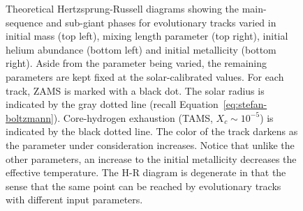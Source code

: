 \begin{figure}
{    }%
    \caption[Evolutionary tracks]{Theoretical Hertzsprung-Russell diagrams showing the main-sequence and sub-giant phases for evolutionary tracks varied in initial mass (top left), mixing length parameter (top right), initial helium abundance (bottom left) and initial metallicity (bottom right). 
    Aside from the parameter being varied, the remaining parameters are kept fixed at the solar-calibrated values. 
    For each track, ZAMS is marked with a black dot. 
    The solar radius is indicated by the gray dotted line (recall Equation~\ref{eq:stefan-boltzmann}). 
    Core-hydrogen exhaustion (TAMS, ${X_c \sim 10^{-5}}$) is indicated by the black dotted line. 
    The color of the track darkens as the parameter under consideration increases. 
    Notice that unlike the other parameters, an increase to the initial metallicity decreases the effective temperature. 
    The H-R diagram is degenerate in that the sense that the same point can be reached by evolutionary tracks with different input parameters. 
    \label{fig:evolutionary-tracks}}
\end{figure}
